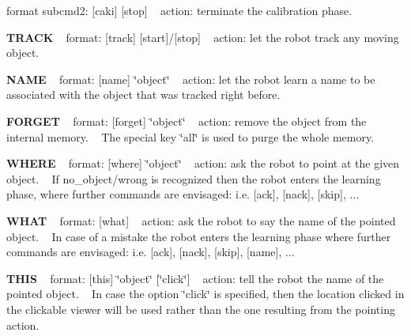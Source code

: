format subcmd2\+: \mbox{[}caki\mbox{]} \mbox{[}stop\mbox{]} ~\newline
action\+: terminate the calibration phase.

{\bfseries T\+R\+A\+CK} ~\newline
format\+: \mbox{[}track\mbox{]} \mbox{[}start\mbox{]}/\mbox{[}stop\mbox{]} ~\newline
action\+: let the robot track any moving object.

{\bfseries N\+A\+ME} ~\newline
format\+: \mbox{[}name\mbox{]} \char`\"{}object\char`\"{} ~\newline
action\+: let the robot learn a name to be associated with the object that was tracked right before.

{\bfseries F\+O\+R\+G\+ET} ~\newline
format\+: \mbox{[}forget\mbox{]} \char`\"{}object\char`\"{} ~\newline
action\+: remove the object from the internal memory. ~\newline
The special key \char`\"{}all\char`\"{} is used to purge the whole memory.

{\bfseries W\+H\+E\+RE} ~\newline
format\+: \mbox{[}where\mbox{]} \char`\"{}object\char`\"{} ~\newline
action\+: ask the robot to point at the given object. ~\newline
If no\+\_\+object/wrong is recognized then the robot enters the learning phase, where further commands are envisaged\+: i.\+e. \mbox{[}ack\mbox{]}, \mbox{[}nack\mbox{]}, \mbox{[}skip\mbox{]}, ...

{\bfseries W\+H\+AT} ~\newline
format\+: \mbox{[}what\mbox{]} ~\newline
action\+: ask the robot to say the name of the pointed object. ~\newline
In case of a mistake the robot enters the learning phase where further commands are envisaged\+: i.\+e. \mbox{[}ack\mbox{]}, \mbox{[}nack\mbox{]}, \mbox{[}skip\mbox{]}, \mbox{[}name\mbox{]}, ...

{\bfseries T\+H\+IS} ~\newline
format\+: \mbox{[}this\mbox{]} \char`\"{}object\char`\"{} \mbox{[}\char`\"{}click\char`\"{}\mbox{]} ~\newline
action\+: tell the robot the name of the pointed object. ~\newline
In case the option \char`\"{}click\char`\"{} is specified, then the location clicked in the clickable viewer will be used rather than the one resulting from the pointing action.

